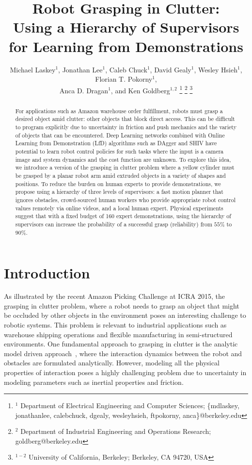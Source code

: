\documentclass[10pt, conference]{ieeeconf}      %
\title{Robot Grasping in Clutter:\\
 Using a Hierarchy of Supervisors for Learning from Demonstrations}
\author{Michael Laskey$^1$, Jonathan Lee$^1$, Caleb Chuck$^1$, David Gealy$^1$, Wesley Hsieh$^1$, Florian T. Pokorny$^1$,\\
 Anca D. Dragan$^1$, and Ken Goldberg$^{1,2}$%
\thanks{$^1$ Department of Electrical Engineering and Computer Sciences; {\small \{mdlaskey, jonathan\textunderscore lee, calebchuck, dgealy, wesleyhsieh, ftpokorny, anca\}@berkeley.edu} }%
\thanks{$^2$ Department of Industrial Engineering and Operations Research; {\small goldberg@berkeley.edu}}%
\thanks{$^{1-2}$ University of California, Berkeley;  Berkeley, CA 94720, USA}%
}
\begin{document}
\maketitle
\thispagestyle{empty}
\pagestyle{empty}



\begin{abstract}
For applications such as Amazon warehouse order fulfillment, robots must grasp a desired object amid clutter: other objects that block direct access. This can be difficult to program explicitly due to uncertainty in friction and push mechanics and the variety of objects that can be encountered. Deep Learning networks combined with Online Learning from Demonstration (LfD) algorithms such as DAgger and SHIV have potential to learn robot control policies for such tasks where the input is a camera image and system dynamics and the cost function are unknown.  To explore this idea, we introduce a version of the grasping in clutter problem where a yellow cylinder must be grasped by a planar robot arm amid extruded objects in a variety of shapes and positions. To reduce the burden on human experts to provide demonstrations, we propose using a hierarchy of three levels of supervisors: a fast motion planner that ignores obstacles, crowd-sourced human workers who provide appropriate robot control values remotely via online videos, and a local human expert. Physical experiments suggest that with a fixed budget of 160 expert demonstrations, using the hierarchy of supervisors can increase the probability of a successful grasp (reliability) from $55\%$ to $90\%$.

 \end{abstract}



\section{Introduction} 
As illustrated by the recent Amazon Picking Challenge at ICRA 2015, the grasping in clutter problem, where a robot needs
to grasp an object that might be occluded by other objects in the environment poses an interesting challenge to robotic
systems. This problem is relevant to industrial applications such as warehouse shipping operations and flexible manufacturing in semi-structured environments. One fundamental approach to grasping in clutter is the analytic model driven approach~\cite{bicchi2000robotic},
where the interaction dynamics between the robot and obstacles are formulated analytically. However, modeling all the 
physical properties of interaction poses a highly challenging problem due to uncertainty in modeling parameters such as
inertial properties and friction. 
\end{document}
